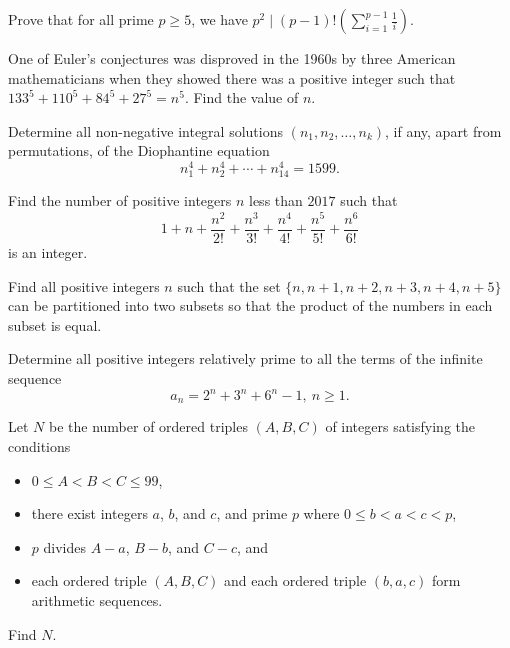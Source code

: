 \documentclass[mast]{lucky}
\begin{document}
\begin{prob}{6}
Prove that for all prime $p\ge5$, we have $p^2\mid (p-1)!\left(\sum\limits_{i=1}^{p-1}\frac1{i}\right)$.
\end{prob}
    
\begin{prob}[AIME 1989/9]{6}
One of Euler's conjectures was disproved in the 1960s by three American mathematicians when they showed there was a positive integer such that $133^5+110^5+84^5+27^5=n^{5}$. Find the value of $n$.
\end{prob}
    
\begin{prob}[USAMO 1979/1]{6}
Determine all non-negative integral solutions $(n_1, n_2, \dots , n_k)$, if any, apart from permutations, of the Diophantine equation
$$n_1^4 + n_2^4 + \cdots + n_{14}^{4} = 1599.$$
\end{prob}

\begin{prob}[AIME II 2017/8]{6}
Find the number of positive integers $n$ less than $2017$ such that
\[ 1+n+\frac{n^2}{2!}+\frac{n^3}{3!}+\frac{n^4}{4!}+\frac{n^5}{5!}+\frac{n^6}{6!} \]is an integer.
\end{prob}

\begin{prob}[IMO 1970/4]{6}
Find all positive integers $n$ such that the set $\{n,n+1,n+2,n+3,n+4,n+5\}$ can be partitioned into two subsets so that the product of the numbers in each subset is equal.
\end{prob}

\begin{prob}[IMO 2005/4]{9}
Determine all positive integers relatively prime to all the terms of the infinite sequence
\[a_n=2^n+3^n+6^n -1,\ n\geq 1.\]
\end{prob}

\begin{prob}[AIME I 2013/15]{13}
Let $N$ be the number of ordered triples $(A,B,C)$ of integers satisfying the conditions
\begin{itemize}
\item $0\le A<B<C\le99$,
\item there exist integers $a$, $b$, and $c$, and prime $p$ where $0\le b<a<c<p$,
\item $p$ divides $A-a$, $B-b$, and $C-c$, and
\item each ordered triple $(A,B,C)$ and each ordered triple $(b,a,c)$ form arithmetic sequences.
\end{itemize}
Find $N$.
\end{prob}
\end{document}
